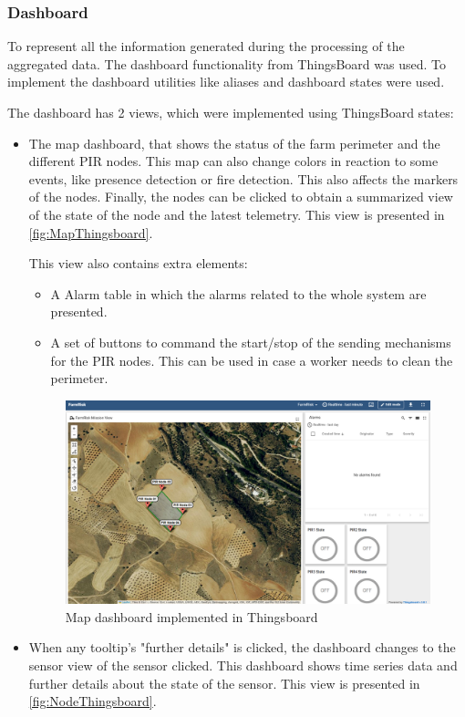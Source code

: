 \subsubsection*{Dashboard}

To represent all the information generated during the processing of the aggregated data. The dashboard 
functionality from ThingsBoard was used. To implement the dashboard utilities like aliases and dashboard 
states were used.

The dashboard has 2 views, which were implemented using ThingsBoard states:
\begin{itemize}
    \item The map dashboard, that shows the status of the farm perimeter and the different PIR nodes. This map can also change colors in reaction 
    to some events, like presence detection or fire detection. This also affects the markers of the nodes. Finally, the nodes can be clicked to obtain 
    a summarized view of the state of the node and the latest telemetry. This view is presented in \autoref{fig:MapThingsboard}.

    This  view also contains extra elements:
    \begin{itemize}
        \item A Alarm table in which the alarms related to the whole system are presented.
        \item A set of buttons to command the start/stop of the sending mechanisms for the PIR nodes. This can be used in case a worker needs to clean the perimeter.
    \end{itemize}
    \begin{figure}[H]
        \centering
        \includegraphics[width=1\textwidth]{./images/8/MapDashboard.png}
        \caption{Map dashboard implemented in Thingsboard}
        \label{fig:MapThingsboard}
    \end{figure}
    \clearpage
    \item When any tooltip's "further details" is clicked, the dashboard changes to the sensor view of the sensor clicked. This dashboard 
    shows time series data and further details about the state of the sensor. This view is presented in \autoref{fig:NodeThingsboard}. 


\end{itemize}
